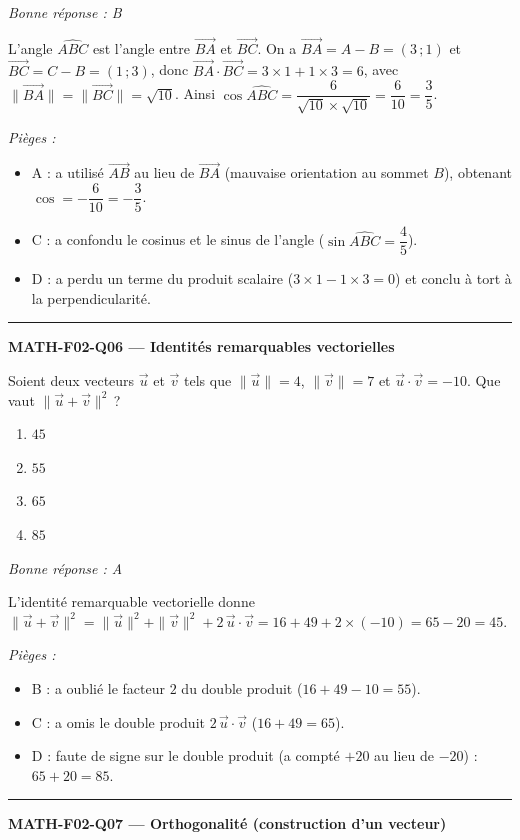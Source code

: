 \documentclass[11pt,a4paper]{article}
\newcommand{\vv}[1]{\vec{#1}}
\begin{document}
\textit{Bonne réponse : B}\par
L'angle $\widehat{ABC}$ est l'angle entre $\vv{BA}$ et $\vv{BC}$. On a $\vv{BA}=A-B=(3\,;1)$ et $\vv{BC}=C-B=(1\,;3)$, donc $\vv{BA}\cdot\vv{BC}=3\times 1+1\times 3=6$, avec $\|\vv{BA}\|=\|\vv{BC}\|=\sqrt{10}$. Ainsi $\cos\widehat{ABC}=\dfrac{6}{\sqrt{10}\times\sqrt{10}}=\dfrac{6}{10}=\dfrac{3}{5}$.\par
\textit{Pièges :}
\begin{itemize}
\item A : a utilisé $\vv{AB}$ au lieu de $\vv{BA}$ (mauvaise orientation au sommet $B$), obtenant $\cos=-\dfrac{6}{10}=-\dfrac{3}{5}$.
\item C : a confondu le cosinus et le sinus de l'angle ($\sin\widehat{ABC}=\dfrac{4}{5}$).
\item D : a perdu un terme du produit scalaire ($3\times 1-1\times 3=0$) et conclu à tort à la perpendicularité.
\end{itemize}
\vspace{8pt}\hrule\vspace{8pt}
\noindent\textbf{MATH-F02-Q06 --- Identités remarquables vectorielles}\par
Soient deux vecteurs $\vv{u}$ et $\vv{v}$ tels que $\|\vv{u}\|=4$, $\|\vv{v}\|=7$ et $\vv{u}\cdot\vv{v}=-10$. Que vaut $\|\vv{u}+\vv{v}\|^2$\,?
\begin{enumerate}[label=\Alph*)]
\item $45$
\item $55$
\item $65$
\item $85$
\end{enumerate}
\textit{Bonne réponse : A}\par
L'identité remarquable vectorielle donne $\|\vv{u}+\vv{v}\|^2=\|\vv{u}\|^2+\|\vv{v}\|^2+2\,\vv{u}\cdot\vv{v}=16+49+2\times(-10)=65-20=45$.\par
\textit{Pièges :}
\begin{itemize}
\item B : a oublié le facteur $2$ du double produit ($16+49-10=55$).
\item C : a omis le double produit $2\,\vv{u}\cdot\vv{v}$ ($16+49=65$).
\item D : faute de signe sur le double produit (a compté $+20$ au lieu de $-20$) : $65+20=85$.
\end{itemize}
\vspace{8pt}\hrule\vspace{8pt}
\noindent\textbf{MATH-F02-Q07 --- Orthogonalité (construction d'un vecteur)}\par
\end{document}
